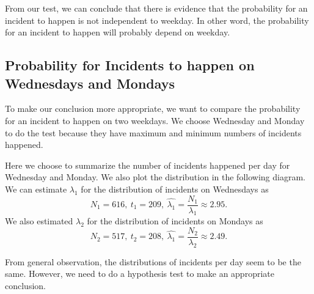 \documentclass[11pt,a4paper,english]{article}
\begin{document}
From our test, we can conclude that there is evidence that the probability for an incident to happen is not independent to weekday. In other word, the probability for an incident to happen will probably depend on weekday.

\subsection{Probability for Incidents to happen on Wednesdays and Mondays}
To make our conclusion more appropriate, we want to compare the probability for an incident to happen on two weekdays. 
We choose Wednesday and Monday to do the test because they have maximum and minimum numbers of incidents happened.

Here we choose to summarize the number of incidents happened per day for Wednesday and Monday. We also plot the distribution in the following diagram.
We can estimate $\lambda_{1}$ for the distribution of incidents on Wednesdays as 
\begin{equation*}
N_{1} = 616,\ t_{1} = 209,\ \hat{\lambda_{1}} = \frac{N_{1}}{\lambda_{1}} \approx 2.95.
\end{equation*}
We also estimated $\lambda_{2}$ for the distribution of incidents on Mondays as
\begin{equation*}
	N_{2} = 517,\ t_{2} = 208,\ \hat{\lambda_{1}} = \frac{N_{2}}{\lambda_{2}} \approx 2.49.
\end{equation*}

From general observation, the distributions of incidents per day seem to be the same. However, we need to do a hypothesis test to make an appropriate conclusion.
\end{document}
